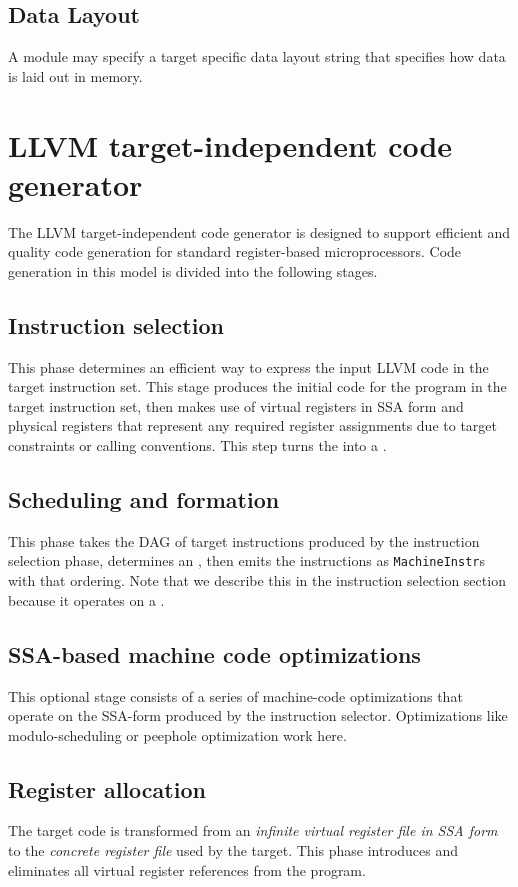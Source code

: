 \documentclass{myproc}
\begin{document}
\subsection{Data Layout}
\bit
\w A module may specify a target specific data layout string that specifies
how data is laid out in memory.
\eit

\section{LLVM target-independent code generator}
The LLVM target-independent code generator is designed to support efficient
and quality code generation for standard register-based microprocessors. Code
generation in this model is divided into the following stages.

\subsection{Instruction selection}  This phase determines an efficient way to express the input LLVM code in the target instruction set. This stage produces the initial code for the program in the target instruction set, then makes use of virtual registers in SSA form and physical registers that represent any required register assignments due to target constraints or calling conventions. This step turns the  into a .

\subsection{Scheduling and formation} This phase takes the DAG of target
instructions produced by the instruction selection phase, determines an
, then emits the instructions as
\verb+MachineInstr+s with that ordering. Note that we describe this in the
instruction selection section because it operates on a .

\subsection{SSA-based machine code optimizations} This optional stage consists
of a series of machine-code optimizations that operate on the SSA-form
produced by the instruction selector. Optimizations like modulo-scheduling or
peephole optimization work here.

\subsection{Register allocation} The target code is transformed from an {\em
  infinite virtual register file in SSA form\/} to the {\em concrete register
  file\/} used by the target. This phase introduces  and
eliminates all virtual register references from the program.
\end{document}
